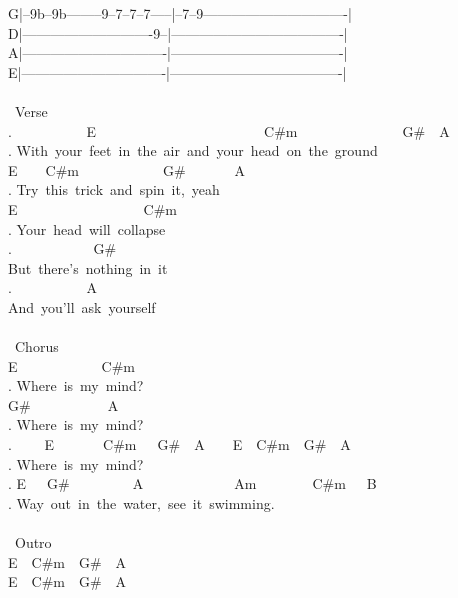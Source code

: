 {G|--9b--9b--------9--7--7--7-----|--7--9-------------------------------|\\
D|----------------------------9--|-------------------------------------|\\
A|-------------------------------|-------------------------------------|\\
E|-------------------------------|-------------------------------------|\\
\\
\lbrack\ Verse\rbrack\\
. \ \ \ \ \ \ \ \ \ \ E\ \ \ \ \ \ \ \ \ \ \ \ \ \ \ \ \ \ \ \ \ \ \ \ C\#m\ \ \ \ \ \ \ \ \ \ \ \ \ \ \ G\#\ \ A\\
. With\ your\ feet\ in\ the\ air\ and\ your\ head\ on\ the\ ground\\
E\ \ \ \ C\#m\ \ \ \ \ \ \ \ \ \ \ \ G\#\ \ \ \ \ \ \ A\\
. Try\ this\ trick\ and\ spin\ it,\ yeah\\
E\ \ \ \ \ \ \ \ \ \ \ \ \ \ \ \ \ \ C\#m\\
. Your\ head\ will\ collapse\\
. \ \ \ \ \ \ \ \ \ \ \ G\#\\
But\ there's\ nothing\ in\ it\\
. \ \ \ \ \ \ \ \ \ \ A\\
And\ you'll\ ask\ yourself\\
\\
\lbrack\ Chorus\rbrack\\
E\ \ \ \ \ \ \ \ \ \ \ \ C\#m\\
. Where\ is\ my\ mind?\\
G\#\ \ \ \ \ \ \ \ \ \ \ A\\
. Where\ is\ my\ mind?\\
. \ \ \ \ E\ \ \ \ \ \ \ C\#m\ \ \ G\#\ \ A\ \ \ \ E\ \ C\#m\ \ G\#\ \ A\\
. Where\ is\ my\ mind?\\
. E\ \ \ G\#\ \ \ \ \ \ \ \ \ A\ \ \ \ \ \ \ \ \ \ \ \ \ Am\ \ \ \ \ \ \ \ C\#m\ \ \ B\\
. Way\ out\ in\ the\ water,\ see\ it\ swimming.\\
\\
\lbrack\ Outro\rbrack\\
E\ \ C\#m\ \ G\#\ \ A\\
E\ \ C\#m\ \ G\#\ \ A\\}
